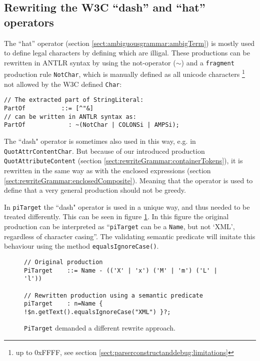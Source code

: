 \subsection{Rewriting the W3C ``dash'' and ``hat'' operators}
\label{sect:implementation:dashOperator}
The ``hat'' operator (section \ref{sect:ambiguousgrammar:ambigTerm}) is mostly used to define legal characters by defining which are illigal. These productions can be rewritten in ANTLR syntax by using the not-operator ($\sim$) and a \verb!fragment! production rule \verb!NotChar!, which is manually defined as all unicode characters \footnote{up to 0xFFFF, see section \ref{sect:parserconstructanddebug:limitations}} not allowed by the W3C defined \verb!Char!:
\begin{Verbatim}
// The extracted part of StringLiteral:
PartOf          ::= [^"&]
// can be written in ANTLR syntax as:
PartOf            : ~(NotChar | COLONSi | AMPSi);
\end{Verbatim}
The ``dash" operator is sometimes also used in this way, e.g. in \verb!QuotAttrContentChar!. But because of our introduced production \verb!QuotAttributeContent! (section \ref{sect:rewriteGrammar:containerTokens}), it is rewritten in the same way as with the enclosed expressions (section \ref{sect:rewriteGrammar:enclosedComposite}). Meaning that the operator is used to define that a very general production should not be greedy. 

In \verb!piTarget! the ``dash" operator is used in a unique way, and thus needed to be treated differently. This can be seen in figure \ref{fig:pitargetRewritten}. In this figure the original production can be interpreted as ``\texttt{piTarget} can be a \texttt{Name}, but not `XML', regardless of character casing''. The validating semantic predicate will imitate this behaviour using the method \verb!equalsIgnoreCase()!.
\begin{figure}[h!]
\begin{Verbatim}
// Original production
PiTarget    ::= Name - (('X' | 'x') ('M' | 'm') ('L' | 'l'))

// Rewritten production using a semantic predicate
piTarget    : n=Name { !$n.getText().equalsIgnoreCase("XML") }?;
\end{Verbatim}
\caption[Rewrite of 'dash' operator]{\texttt{PiTarget} demanded a different rewrite approach.}
\label{fig:pitargetRewritten}
\end{figure}


